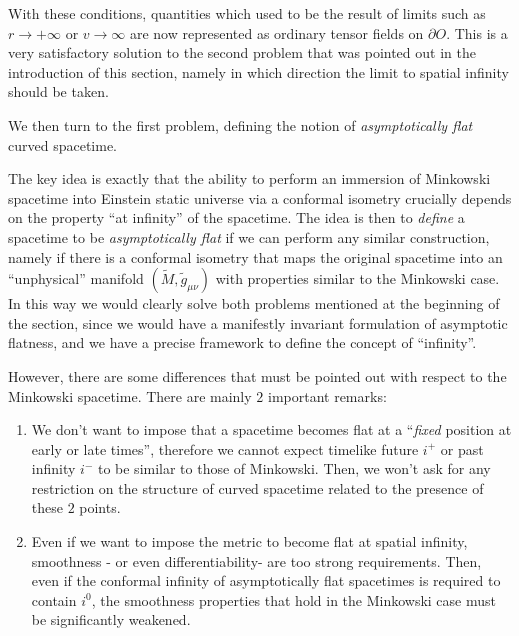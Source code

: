 With these conditions, quantities which used to be the result of limits such as \(r\rightarrow +\infty\) or \(v\rightarrow \infty\) are now represented as ordinary tensor fields on \(\partial O\). This is a very satisfactory solution to the second problem that was pointed out in the introduction of this section, namely in which direction the limit to spatial infinity should be taken.

We then turn to the first problem, defining the notion of \emph{asymptotically flat} curved spacetime.

\noindent The key idea is exactly that the ability to perform an immersion of Minkowski spacetime into Einstein static universe via a conformal isometry crucially depends on the property ``at infinity'' of the spacetime. The idea is then to \emph{define} a spacetime to be \emph{asymptotically flat} if we can perform any similar construction, namely if there is a conformal isometry that maps the original spacetime into an ``unphysical'' manifold \((\tilde{M}, \tilde{g}_{\mu\nu})\) with properties similar to the Minkowski case.
In this way we would clearly solve both problems mentioned at the beginning of the section, since we would have a manifestly invariant formulation of asymptotic flatness, and we have a precise framework to define the concept of ``infinity''.

\begin{remark}
	However, there are some differences that must be pointed out with respect to the Minkowski spacetime. There are mainly \(2\) important remarks:
	\begin{enumerate}[label=(\Roman*)]
		\item We don't want to impose that a spacetime becomes flat at a ``\emph{fixed} position at early or late times'', therefore we cannot expect timelike future \(i^{+}\) or past infinity \(i^{-}\) to be similar to those of Minkowski. Then, we won't ask for any restriction on the structure of curved spacetime related to the presence of these \(2\) points.
		\item  Even if we want to impose the metric to become flat at spatial infinity, smoothness - or even differentiability- are too strong requirements. Then, even if the conformal infinity of asymptotically flat spacetimes is required to contain \(i^0\), the smoothness properties that hold in the Minkowski case must be significantly weakened.
	\end{enumerate}
\end{remark}

